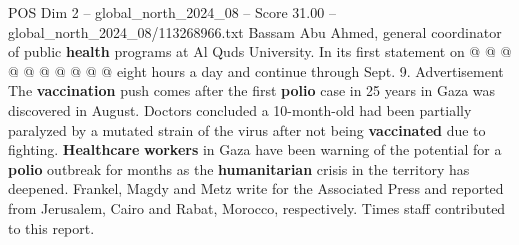 \begin{textsample}{POS Dim 2 – global\_north\_2024\_08 – Score 31.00 – global\_north\_2024\_08/113268966.txt}
Bassam Abu Ahmed, general coordinator of public \textbf{health} programs at Al Quds University.
In its first statement on @ @ @ @ @ @ @ @ @ @ eight hours a day and continue through Sept. 9.
Advertisement The \textbf{vaccination} push comes after the first \textbf{polio} case in 25 years in Gaza was discovered in August.
Doctors concluded a 10-month-old had been partially paralyzed by a mutated strain of the virus after not being \textbf{vaccinated} due to fighting. \textbf{Healthcare} \textbf{workers} in Gaza have been warning of the potential for a \textbf{polio} outbreak for months as the \textbf{humanitarian} crisis in the territory has deepened.
Frankel, Magdy and Metz write for the Associated Press and reported from Jerusalem, Cairo and Rabat, Morocco, respectively.
Times staff contributed to this report.

\end{textsample}
